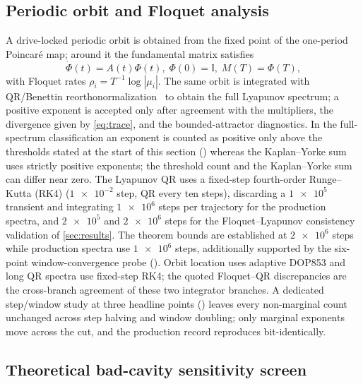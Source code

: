 \documentclass[preprint,numbers,a4paper]{elsarticle}
\begin{document}
\subsection{Periodic orbit and Floquet analysis}

A drive-locked periodic orbit is obtained from the fixed point of the one-period Poincar\'e map; around it the fundamental matrix satisfies
\begin{equation}
\dot{\Phi}(t)=A(t)\Phi(t),\;\Phi(0)=\mathbb{I},\;M(T)=\Phi(T),
\label{eq:monodromy}
\end{equation}
with Floquet rates $\rho_i=T^{-1}\log|\mu_i|$. The same orbit is integrated with QR/Benettin reorthonormalization~\cite{shimada1979,benettin1980,wolf1985,eckmann1985} to obtain the full Lyapunov spectrum; a positive exponent is accepted only after agreement with the multipliers, the divergence given by \eqref{eq:trace}, and the bounded-attractor diagnostics. In the full-spectrum classification an exponent is counted as positive only above the thresholds stated at the start of this section () whereas the Kaplan--Yorke sum uses strictly positive exponents; the threshold count and the Kaplan--Yorke sum can differ near zero. The Lyapunov QR uses a fixed-step fourth-order Runge--Kutta (RK4) ($\num{1e-2}$ step, QR every ten steps), discarding a $\num{1e5}$ transient and integrating $\num{1e6}$ steps per trajectory for the production spectra, and $\num{2e5}$ and $\num{2e6}$ steps for the Floquet--Lyapunov consistency validation of \cref{sec:results}. The theorem bounds are established at $\num{2e6}$ steps while production spectra use $\num{1e6}$ steps, additionally supported by the six-point window-convergence probe (). Orbit location uses adaptive DOP853 and long QR spectra use fixed-step RK4; the quoted Floquet--QR discrepancies are the cross-branch agreement of these two integrator branches. A dedicated step/window study at three headline points () leaves every non-marginal count unchanged across step halving and window doubling; only marginal exponents move across the cut, and the production record reproduces bit-identically.

\subsection{Theoretical bad-cavity sensitivity screen}
\end{document}
